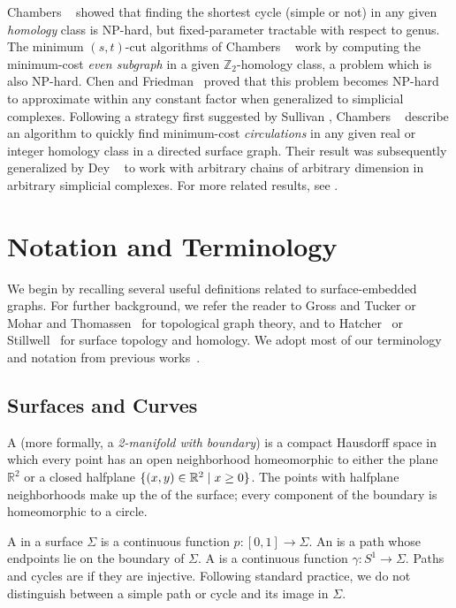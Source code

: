 \documentclass[twoside,leqno,twocolumn]{article}
\def\Z{\mathbb{Z}}
\def\Real{\mathbb{R}}
\begin{document}
Chambers \etal~\cite{ccelw-scsih-08} showed that finding the shortest cycle (simple or not) in any given \emph{homology} class is NP-hard, but fixed-parameter tractable with respect to genus.  The minimum $(s,t)$-cut algorithms of Chambers \etal~\cite{cen-mcshc-09, en-mcsnc-11} work by computing the minimum-cost \emph{even subgraph} in a given $\Z_2$-homology class, a problem which is also NP-hard.  Chen and Friedman~\cite{cf-qhc-08, cf-hrhl-10} proved that this problem becomes NP-hard to approximate within any constant factor when generalized to simplicial complexes.  Following a strategy first suggested by Sullivan \cite{s-cath-90}, Chambers \etal~\cite{cen-hfcc-09} describe an algorithm to quickly find minimum-cost \emph{circulations} in any given real or integer homology class in a directed surface graph.  Their result was subsequently generalized by Dey \etal~\cite{dhk-ohctu-11} to work with arbitrary chains of arbitrary dimension in arbitrary simplicial complexes.  For more related results, see \cite{cf-mcngh-10, dh-lsako-11, dls-chtl-07, ew-gohhg-05}.

\section{Notation and Terminology}
\label{S:back}

We begin by recalling several useful definitions related to surface-embedded graphs.  For further background, we refer the reader to Gross and Tucker \cite{gt-tgt-01} or Mohar and Thomassen~\cite{mt-gs-01} for topological graph theory, and to Hatcher~\cite{h-at-02} or Stillwell~\cite{s-ctcgt-93} for surface topology and homology.  We adopt most of our terminology and notation from previous works~\cite{cen-mcshc-09, en-mcsnc-11}.

\subsection{Surfaces and Curves}

A  (more formally, a \emph{2-manifold with boundary}) is a compact Hausdorff space in which every point has an open neighborhood homeomorphic to either the plane $\Real^2$ or a closed halfplane $\set{(x,y)\in \Real^2\mid x\ge 0}$.  The points with halfplane neighborhoods make up the  of the surface; every component of the boundary is homeomorphic to a circle.

A  in a surface $\Sigma$ is a continuous function $p\colon [0,1]\to\Sigma$.  An  is a path whose endpoints lie on the boundary of $\Sigma$.  A  is a continuous function $\gamma\colon S^1\to\Sigma$.  Paths and cycles are  if they are injective.  Following standard practice, we do not distinguish between a simple path or cycle and its image in $\Sigma$.
\end{document}

